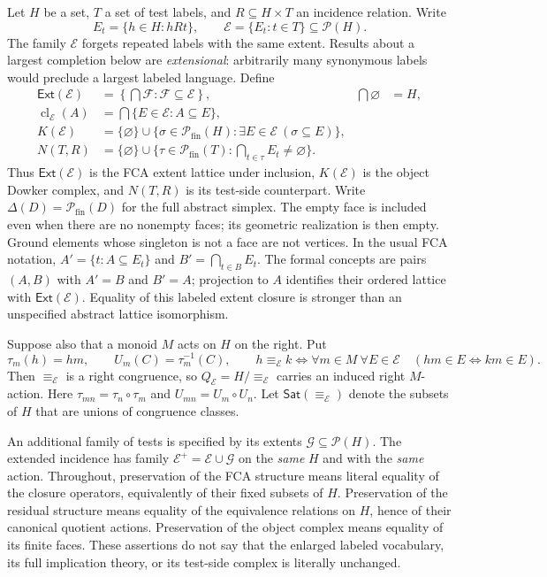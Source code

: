 \documentclass[11pt]{article}
\theoremstyle{definition}
\newcommand{\Pow}{\mathcal P}
\newcommand{\Fin}{\mathcal P_{\mathrm{fin}}}
\newcommand{\Ext}{\mathsf{Ext}}
\newcommand{\Sat}{\mathsf{Sat}}
\newcommand{\cl}{\operatorname{cl}}
\begin{document}
Let $H$ be a set, $T$ a set of test labels, and
$R\subseteq H\times T$ an incidence relation. Write
\[
 E_t=\{h\in H:hRt\},\qquad \mathcal E=\{E_t:t\in T\}\subseteq\Pow(H).
\]
The family $\mathcal E$ forgets repeated labels with the same extent. Results
about a largest completion below are \emph{extensional}: arbitrarily many
synonymous labels would preclude a largest labeled language.
Define
\begin{align*}
 \Ext(\mathcal E)&=\left\{\bigcap\mathcal F:\mathcal F\subseteq\mathcal E\right\},
 &\bigcap\varnothing&=H,\\
 \cl_{\mathcal E}(A)&=\bigcap\{E\in\mathcal E:A\subseteq E\},\\
 K(\mathcal E)&=\{\varnothing\}\cup
 \{\sigma\in\Fin(H):\exists E\in\mathcal E\ (\sigma\subseteq E)\},\\
 N(T,R)&=\{\varnothing\}\cup
 \{\tau\in\Fin(T):\bigcap_{t\in\tau}E_t\ne\varnothing\}.
\end{align*}
Thus $\Ext(\mathcal E)$ is the FCA extent lattice under inclusion,
$K(\mathcal E)$ is the object Dowker complex, and $N(T,R)$ is its test-side
counterpart. Write $\Delta(D)=\Fin(D)$ for the full abstract simplex.
The empty face is included even when there are no nonempty faces;
its geometric realization is then empty. Ground elements whose singleton is
not a face are not vertices. In the usual FCA notation,
$A'=\{t:A\subseteq E_t\}$ and $B'=\bigcap_{t\in B}E_t$.
The formal concepts are pairs $(A,B)$ with $A'=B$ and $B'=A$;
projection to $A$ identifies their ordered lattice with
$\Ext(\mathcal E)$. Equality of this labeled extent closure is stronger
than an unspecified abstract lattice isomorphism.

Suppose also that a monoid $M$ acts on $H$ on the right. Put
\[
 \tau_m(h)=hm,\qquad U_m(C)=\tau_m^{-1}(C),\qquad
 h\equiv_{\mathcal E}k
 \Longleftrightarrow
 \forall m\in M\ \forall E\in\mathcal E\quad
 (hm\in E\Longleftrightarrow km\in E).
\]
Then $\equiv_{\mathcal E}$ is a right congruence, so
$Q_{\mathcal E}=H/{\equiv_{\mathcal E}}$ carries an induced right $M$-action.
Here $\tau_{mn}=\tau_n\circ\tau_m$ and $U_{mn}=U_m\circ U_n$.
Let $\Sat(\equiv_{\mathcal E})$ denote the subsets of $H$ that are unions of
congruence classes.

An additional family of tests is specified by its extents
$\mathcal G\subseteq\Pow(H)$. The extended incidence has family
$\mathcal E^+=\mathcal E\cup\mathcal G$ on the \emph{same} $H$ and with the
\emph{same} action. Throughout, preservation of the FCA structure means
literal equality of the closure operators, equivalently of their fixed
subsets of $H$. Preservation of the residual structure means equality of the
equivalence relations on $H$, hence of their canonical quotient actions.
Preservation of the object complex means equality of its finite faces.
These assertions do not say that the enlarged labeled vocabulary, its full
implication theory, or its test-side complex is literally unchanged.
\end{document}
